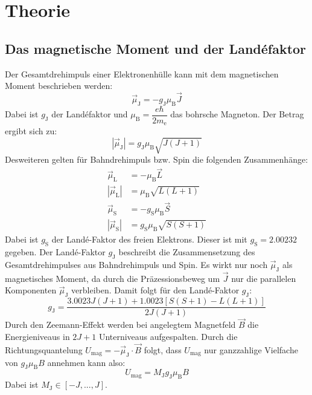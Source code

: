 \section{Theorie}
\label{sec:Theorie}
\subsection{Das magnetische Moment und der Landéfaktor}
\label{sec:magmom}
Der Gesamtdrehimpuls einer Elektronenhülle kann mit dem magnetischen Moment beschrieben werden:
\begin{equation}
  \label{eqn:magneton}
  \vec{\mu}_\mathrm{J}=-g_\mathrm{J}\mu_\mathrm{B}\vec{J}
\end{equation}
Dabei ist $g_\mathrm{J}$ der Landéfaktor und $\mu_\mathrm{B}=\dfrac{e\hbar}{2m_\mathrm{e}}$ das bohrsche Magneton. Der Betrag ergibt sich zu:
\begin{equation}
  \label{absolute}
  |\vec{\mu}_\mathrm{J}|=g_\mathrm{J}\mu_\mathrm{B}\sqrt{J(J+1)}
\end{equation}
Desweiteren gelten für Bahndrehimpuls bzw. Spin die folgenden Zusammenhänge:
\begin{align}
  \vec{\mu}_\mathrm{L}&=-\mu_\mathrm{B}\vec{L} \\
  |\vec{\mu}_\mathrm{L}|&=\mu_\mathrm{B}\sqrt{L(L+1)} \\
  \vec{\mu}_\mathrm{S}&=-g_\mathrm{S}\mu_\mathrm{B}\vec{S} \\
  |\vec{\mu}_\mathrm{S}|&=g_\mathrm{S}\mu_\mathrm{B}\sqrt{S(S+1)}
\end{align}
Dabei ist $g_\mathrm{S}$ der Landé-Faktor des freien Elektrons. Dieser ist mit $g_\mathrm{S}=2.00232$ gegeben.
Der Landé-Faktor $g_\mathrm{J}$ beschreibt die Zusammensetzung des Gesamtdrehimpulses aus Bahndrehimpuls und Spin. Es wirkt nur noch $\vec{\mu}_\mathrm{J}$ als magnetisches Moment, da durch die Präzessionsbeweg um $\vec{J}$ nur die parallelen Komponenten $\vec{\mu}_\mathrm{J}$ verbleiben. Damit folgt für den Landé-Faktor $g_\mathrm{J}$:
\begin{equation}
  \label{eqn:lande}
  g_\mathrm{J}=\dfrac{3.0023J(J+1)+1.0023[S(S+1)-L(L+1)]}{2J(J+1)}
\end{equation}
Durch den Zeemann-Effekt werden bei angelegtem Magnetfeld $\vec{B}$ die Energieniveaus in $2J+1$ Unterniveaus aufgespalten. Durch die Richtungsquantelung $U_\mathrm{mag}=-\vec{\mu}_\mathrm{J}\cdot\vec{B}$ folgt, dass $U_\mathrm{mag}$
nur ganzzahlige Vielfache von $g_\mathrm{J}\mu_\mathrm{B}B$ annehmen kann also:
\begin{equation}
  \label{eqn:mj}
  U_\mathrm{mag}=M_\mathrm{J}g_\mathrm{J}\mu_\mathrm{B}B
\end{equation}
Dabei ist $M_\mathrm{J}\in[-J,...,J]$.
